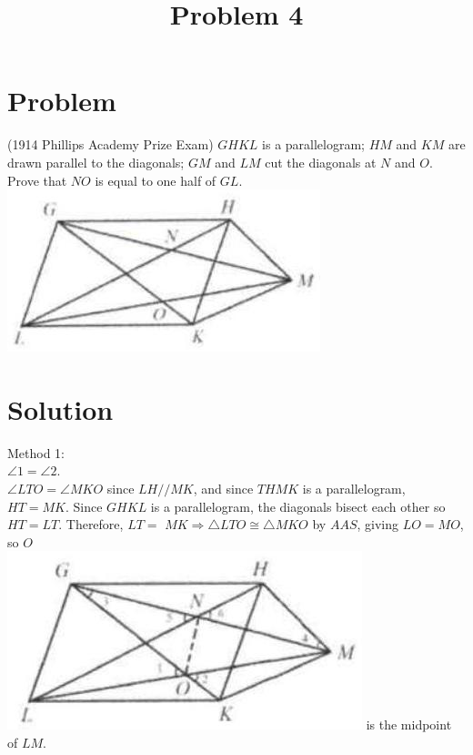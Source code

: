 \documentclass{article}
\title{Problem 4}
\date{}
\begin{document}
\maketitle

\section*{Problem}
(1914 Phillips Academy Prize Exam) \(G H K L\) is a parallelogram; \(H M\) and \(K M\) are drawn parallel to the diagonals; \(G M\) and \(L M\) cut the diagonals at \(N\) and \(O\). Prove that \(N O\) is equal to one half of \(G L\).\\
\centering
\includegraphics[width=\textwidth]{images/044(2).jpg}

\section*{Solution}
Method 1:\\
\(\angle 1=\angle 2\).\\
\(\angle L T O=\angle M K O\) since \(L H / / M K\), and since \(T H M K\) is a parallelogram, \(H T=M K\). Since \(G H K L\) is a parallelogram, the diagonals bisect each other so \(H T=L T\). Therefore, \(L T=\) \(M K \Rightarrow \triangle L T O \cong \triangle M K O\) by \(A A S\), giving \(L O=M O\), so \(O\)\\
\includegraphics[width=\textwidth]{images/048(1).jpg} is the midpoint of \(L M\).
\end{document}
